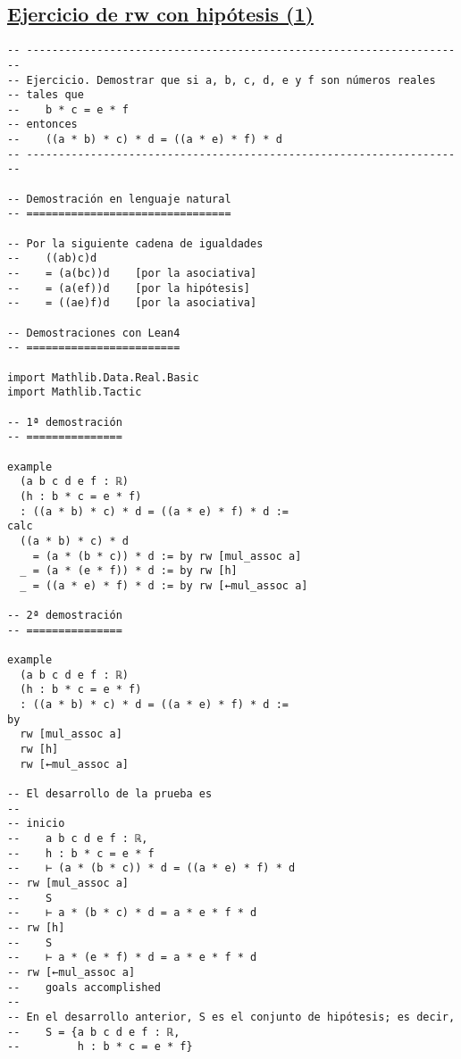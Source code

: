 \subsection{\href{./src/Basicos/Ejercicio\_de\_rw\_sobre\_hipotesis\_1.lean}{Ejercicio de rw con hipótesis (1)}}
\label{sec:org9790691}
\begin{verbatim}
-- ---------------------------------------------------------------------
-- Ejercicio. Demostrar que si a, b, c, d, e y f son números reales
-- tales que
--    b * c = e * f
-- entonces
--    ((a * b) * c) * d = ((a * e) * f) * d
-- ---------------------------------------------------------------------

-- Demostración en lenguaje natural
-- ================================

-- Por la siguiente cadena de igualdades
--    ((ab)c)d
--    = (a(bc))d    [por la asociativa]
--    = (a(ef))d    [por la hipótesis]
--    = ((ae)f)d    [por la asociativa]

-- Demostraciones con Lean4
-- ========================

import Mathlib.Data.Real.Basic
import Mathlib.Tactic

-- 1ª demostración
-- ===============

example
  (a b c d e f : ℝ)
  (h : b * c = e * f)
  : ((a * b) * c) * d = ((a * e) * f) * d :=
calc
  ((a * b) * c) * d
    = (a * (b * c)) * d := by rw [mul_assoc a]
  _ = (a * (e * f)) * d := by rw [h]
  _ = ((a * e) * f) * d := by rw [←mul_assoc a]

-- 2ª demostración
-- ===============

example
  (a b c d e f : ℝ)
  (h : b * c = e * f)
  : ((a * b) * c) * d = ((a * e) * f) * d :=
by
  rw [mul_assoc a]
  rw [h]
  rw [←mul_assoc a]

-- El desarrollo de la prueba es
--
-- inicio
--    a b c d e f : ℝ,
--    h : b * c = e * f
--    ⊢ (a * (b * c)) * d = ((a * e) * f) * d
-- rw [mul_assoc a]
--    S
--    ⊢ a * (b * c) * d = a * e * f * d
-- rw [h]
--    S
--    ⊢ a * (e * f) * d = a * e * f * d
-- rw [←mul_assoc a]
--    goals accomplished
--
-- En el desarrollo anterior, S es el conjunto de hipótesis; es decir,
--    S = {a b c d e f : ℝ,
--         h : b * c = e * f}
\end{verbatim}

